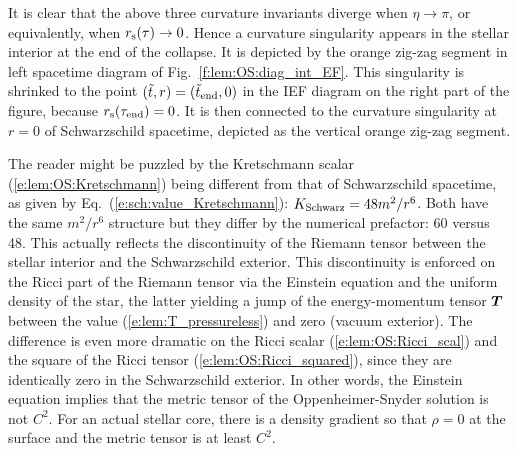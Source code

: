 It is clear that the above three curvature invariants diverge when $\eta\to \pi$,
or equivalently, when $r_{\rm s}(\tau)\to 0$. Hence a curvature singularity
appears in the stellar interior at the end of the collapse.
It is depicted by the orange zig-zag segment in left spacetime diagram
of Fig.~\ref{f:lem:OS:diag_int_EF}. This singularity is shrinked to the point
$({\tilde t}, r) = ({\tilde t}_{\rm end}, 0)$ in the IEF diagram on the right part of the figure,
because $r_{\rm s}(\tau_{\rm end}) = 0$. It is then connected to the
curvature singularity at $r=0$ of Schwarzschild spacetime, depicted as the
vertical orange zig-zag segment.

\begin{remark}
The reader might be puzzled by the Kretschmann scalar (\ref{e:lem:OS:Kretschmann})
being different from that of Schwarzschild spacetime, as given by Eq.~(\ref{e:sch:value_Kretschmann}):
$K_{\rm Schwarz} = 48 m^2/r^6$. Both
have the same $m^2/r^6$ structure but they differ by the numerical prefactor: 60 versus 48.
This actually reflects the discontinuity of the Riemann tensor between the stellar interior
and the Schwarzschild exterior. This discontinuity is enforced on the Ricci part of the Riemann
tensor via the Einstein equation and the uniform density of the star, the latter yielding
a jump of the energy-momentum tensor $\bm{T}$ between the value (\ref{e:lem:T_pressureless})
and zero (vacuum exterior). The difference is even more dramatic on the Ricci scalar
(\ref{e:lem:OS:Ricci_scal})
and the square of the Ricci tensor (\ref{e:lem:OS:Ricci_squared}), since they are
identically zero in the Schwarzschild exterior. In other words, the Einstein equation
implies that the metric tensor of the Oppenheimer-Snyder solution is not $C^2$.
For an actual stellar core, there is a density gradient so that $\rho=0$
at the surface and the metric tensor is at least $C^2$.
\end{remark}

